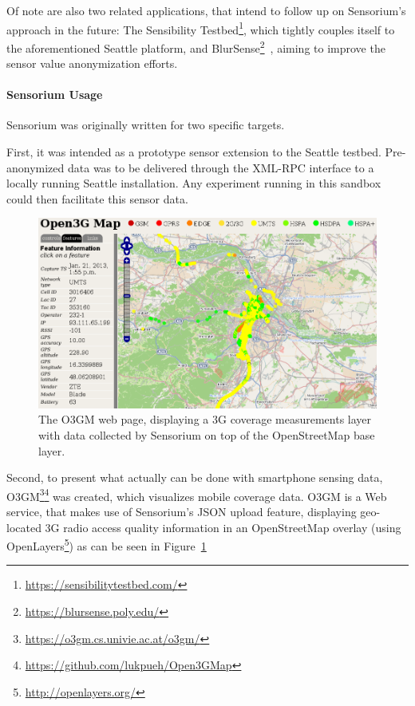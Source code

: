 Of note are also two related applications, that intend to follow up on Sensorium's approach in the future: The Sensibility Testbed\footnote{\url{https://sensibilitytestbed.com/}}, which tightly couples itself to the aforementioned Seattle platform, and BlurSense\footnote{\url{https://blursense.poly.edu/}}~\cite{6798970}, aiming to improve the sensor value anonymization efforts. 


\paragraph{Sensorium Usage}

Sensorium was originally written for two specific targets.

First, it was intended as a prototype sensor extension to the Seattle testbed. Pre-anonymized data was to be delivered through the \acrshort{XML}-\acrshort{RPC} interface to a locally running Seattle installation. Any experiment running in this sandbox could then facilitate this sensor data.

\begin{figure}[htb]
	\centering
	\includegraphics[width=\textwidth]{images/o3gm.png}
	\caption{The \gls{O3GM} web page, displaying a \gls{3G} coverage measurements layer with data collected by Sensorium on top of the OpenStreetMap base layer.}
\label{c5:fig:ogggm}
\end{figure}

Second, to present what actually can be done with smartphone sensing data, \gls{O3GM}\footnote{\url{https://o3gm.cs.univie.ac.at/o3gm/}}\footnote{\url{https://github.com/lukpueh/Open3GMap}} was created, which visualizes mobile coverage data. \gls{O3GM} is a Web service, that makes use of Sensorium's \acrshort{JSON} upload feature, displaying geo-located \gls{3G} radio access quality information in an OpenStreetMap overlay (using OpenLayers\footnote{\url{http://openlayers.org/}}) as can be seen in Figure~\ref{c5:fig:ogggm}

